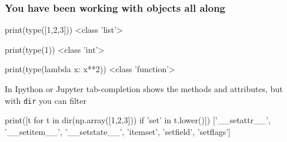\documentclass[table,dvipsnames]{beamer}
\newcommand{\highlt}{\textcolor{NavyBlue}}
\begin{document}

\begin{frame}[fragile]
\scriptsize
\frametitle{You have been working with objects all along}
\begin{code}
print(type([1,2,3]))
<class 'list'>

print(type(1))
<class 'int'>

print(type(lambda x: x**2))
<class 'function'>
\end{code}

\begin{block}{}
 In Ipython or Jupyter \highlt{tab-completion} shows the methods and attributes, but with \texttt{dir} you can filter
\end{block}
\begin{code}
print([t for t in dir(np.array([1,2,3])) if 'set' in t.lower()])
['__setattr__', '__setitem__', '__setstate__', 'itemset', 'setfield', 'setflags']
\end{code}
\end{frame}
\end{document}

